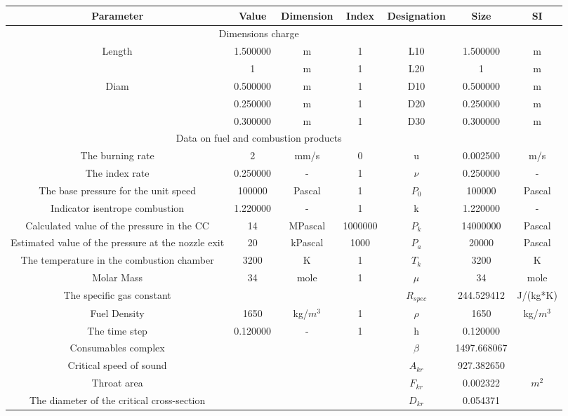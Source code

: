 \begin{center}
\begin{tabular}{  | c | c | c | c | c | c | c | }
\hline
Parameter & Value & Dimension & Index & Designation & Size & SI \\
\hline
\multicolumn{6}{|c}{Dimensions charge} & \\
\hline
Length & 1.500000 & m & 1 & L10 & 1.500000 & m \\
  & 1 & m & 1 & L20 & 1 & m \\
\hline
Diam & 0.500000 & m & 1 & D10 & 0.500000 & m \\
  & 0.250000 & m & 1 & D20 & 0.250000 & m \\
  & 0.300000 & m & 1 & D30 & 0.300000 & m \\
\hline
\multicolumn{6}{|c}{Data on fuel and combustion products} & \\
\hline
The burning rate & 2 & mm/s & 0 & u & 0.002500 & m/s \\
\hline
The index rate & 0.250000 &  -  & 1 & $\nu$ & 0.250000 &  -  \\
\hline
The base pressure for the unit speed & 100000 & Pascal & 1 & $P_0$ & 100000 & Pascal \\
\hline
Indicator isentrope combustion & 1.220000 &  -  & 1 & k & 1.220000 &  -  \\
\hline
Calculated value of the pressure in the CC & 14 & MPascal & 1000000 & $P_k$ & 14000000 & Pascal \\
\hline
Estimated value of the pressure at the nozzle exit & 20 & kPascal & 1000 & $P_a$ & 20000 & Pascal \\
\hline
The temperature in the combustion chamber & 3200 & K & 1 & $T_k$ & 3200 & K \\
\hline
Molar Mass & 34 & mole & 1 & $\mu$ & 34 & mole \\
\hline
The specific gas constant &  &  &  & $R_{spec}$ & 244.529412 & J/(kg*K) \\
\hline
Fuel Density & 1650 & kg/$m^3$ & 1 & $\rho$ & 1650 & kg/$m^3$ \\
\hline
The time step & 0.120000 &  -  & 1 & h & 0.120000 &   \\
\hline
Consumables complex &  &  &  & $\beta$ & 1497.668067 &   \\
\hline
Critical speed of sound &  &  &  & $A_{kr}$ & 927.382650 &   \\
\hline
Throat area &  &  &  & $F_{kr}$ & 0.002322 & $m^2$ \\
\hline
The diameter of the critical cross-section &  &  &  & $D_{kr}$ & 0.054371 &   \\

\end{tabular}
\end{center}
